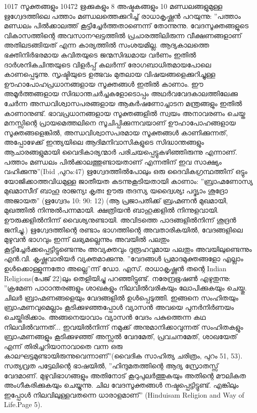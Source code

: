 1017 സൂക്തങ്ങളും 10472 ഋക്കുകളും 8 അഷ്ടകങ്ങളും 10 മണ്ഡലങ്ങളുമുള്ള ഋഗ്വേദത്തിലെ പത്താം മണ്ഡലത്തെക്കുറിച്ച് രാധാകൃഷ്ണന്‍ പറയുന്നു: ''പത്താം മണ്ഡലം പില്‍ക്കാലത്ത് കൂട്ടിച്ചേര്‍ത്തതാണെന്ന് തോന്നുന്നു. വേദസൂക്തങ്ങളുടെ വികാസത്തിന്റെ അവസാനഘട്ടത്തില്‍ പ്രചാരത്തിലിരുന്ന വീക്ഷണങ്ങളാണ് അതിലടങ്ങിയത് എന്ന കാര്യത്തില്‍ സംശയമില്ല. ആദ്യകാലത്തെ ഭക്തിനിര്‍ഭരമായ കവിതയുടെ ജന്മസിദ്ധമായ വര്‍ണം ഇതില്‍ ദാര്‍ശനികചിന്തയുടെ വിളര്‍പ്പ് കലര്‍ന്ന് രോഗബാധിതമായപോലെ കാണപ്പെടുന്നു. സൃഷ്ടിയുടെ ഉത്ഭവം മുതലായ വിഷയങ്ങളെക്കുറിച്ചുള്ള ഊഹാപോഹപ്രധാനങ്ങളായ സൂക്തങ്ങള്‍ ഇതില്‍ കാണാം. ഈ അമൂര്‍ത്തങ്ങളായ സിദ്ധാന്തചര്‍ച്ചകളോടൊപ്പം അഥര്‍വവേദകാലത്തിലേക്കു ചേര്‍ന്ന അന്ധവിശ്വാസപരങ്ങളായ ആകര്‍ഷണോച്ചാടന മന്ത്രങ്ങളും ഇതില്‍ കാണാനുണ്ട്. ഭാവപ്രധാനങ്ങളായ സൂക്തങ്ങളില്‍ സ്വയം അനാവരണം ചെയ്ത മനസ്സിന്റെ പ്രായമെത്തലിനെ സൂചിപ്പിക്കുന്നവയാണ് ഊഹാപോഹങ്ങളായ സൂക്തങ്ങളെങ്കില്‍, അന്ധവിശ്വാസപരമായ സൂക്തങ്ങള്‍ കാണിക്കുന്നത്, അപ്പോഴേക്ക് ഇന്ത്യയിലെ ആദിമനിവാസികളുടെ സിദ്ധാന്തങ്ങളും ആചാരങ്ങളുമായി വൈദികാര്യന്മാര്‍ പരിചയപ്പെട്ടുകഴിഞ്ഞിരുന്നു എന്നാണ്. പത്താം മണ്ഡലം പില്‍ക്കാലത്തുണ്ടായതാണ് എന്നതിന് ഇവ സാക്ഷ്യം വഹിക്കുന്നു''(Ibid ,പുറം:47)
ഋഗ്വേദത്തില്‍പോലും ഒരു ദൈവികഗ്രന്ഥത്തിന് ഒട്ടും യോജിക്കാത്തവിധമുള്ള ജാതീയത കടന്നുകൂടിയതായി കാണാം:
''ബ്രാഹ്മണോസ്യ മുഖമാസീദ്
ബാഹൂ രാജന്യഃ കൃതഃ
ഊരു തദസ്യ യദ്വൈശ്യഃ
പദ്ഭ്യാം ശൂദ്രോ അജായത'' (ഋഗ്വേദം 10: 90: 12)
(ആ പ്രജാപതിക്ക് ബ്രഹ്മണന്‍ മുഖമായി, മുഖത്തില്‍ നിന്നുല്‍പന്നമായി. ക്ഷത്രിയന്‍ ബാഹുക്കളില്‍ നിന്നുളവായി. ഊരുക്കളില്‍നിന്ന് വൈശ്യനുണ്ടായി. അവിടത്തെ പാദങ്ങളില്‍നിന്ന് ശൂദ്രന്‍ ജനിച്ചു.)
ഋഗ്വേദത്തിന്റെ രണ്ടാം ഭാഗത്തിന്റെ അവതാരികയില്‍, വേദങ്ങളിലെ മുഴുവന്‍ ഭാഗവും ഇന്ന് ലഭ്യമല്ലെന്നും അവയില്‍ പലതും കൂട്ടിച്ചേര്‍ക്കപ്പെട്ടിട്ടുണ്ടെന്നും അവ്യക്തവും ദുരൂഹവുമായ പലതും അവയിലുണ്ടെന്നും എന്‍.വി. കൃഷ്ണവാരിയര്‍ വ്യക്തമാക്കുന്നു.
''വേദങ്ങള്‍ പ്രമാദമുക്തങ്ങളോ എല്ലാം ഉള്‍ക്കൊള്ളുന്നതോ അല്ലെ''ന്ന് ഡോ. എസ്. രാധാകൃഷ്ണന്‍ തന്റെ Indian Religions(പേജ് 22)ലും തെളിയിച്ചു പറഞ്ഞിട്ടുണ്ട്. നരേന്ദ്രഭൂഷണ്‍ എഴുതുന്നു: ''ക്രമേണ പാഠാന്തരങ്ങളും ശാഖകളും നിലവില്‍വരികയും ലോപിക്കുകയും ചെയ്തു. ചിലര്‍ ബ്രാഹ്മണങ്ങളെയും വേദങ്ങളില്‍ ഉള്‍പ്പെടുത്തി. ഇങ്ങനെ സംഹിതയും ബ്രാഹ്മണവുമെല്ലാം കൂടിക്കുഴഞ്ഞപ്പോള്‍ വ്യാസന്‍ അവയെ പുനര്‍നിര്‍ണയം ചെയ്തിരിക്കാം. അങ്ങനെയാവാം വ്യാസന്‍ വേദം പകുത്തെന്ന കഥ നിലവില്‍വന്നത്... ഇവയില്‍നിന്ന് നമുക്ക് അനുമാനിക്കാവുന്നത് സംഹിതകളും ബ്രാഹ്മണങ്ങളും കൂടിക്കുഴഞ്ഞ് അസ്സല്‍ വേദമേത്, പ്രവചനമേത്, ശാഖയേത് എന്ന് തിരിച്ചറിയാനാവാതെ വന്ന ഒരു കാലഘട്ടമുണ്ടായിരുന്നുവെന്നാണ്''(വൈദിക സാഹിത്യ ചരിത്രം, പുറം 51, 53).
സത്യവ്രത പട്ടേലിന്റെ ഭാഷയില്‍, ''ഹിന്ദുമതത്തിന്റെ ആദ്യ സ്രോതസ്സ് വേദമാണ്. മുഴുവിഭാഗങ്ങളും അതിനോട് കൂറുപുലര്‍ത്തുകയും അതിന്റെ മൗലികത അംഗീകരിക്കുകയും ചെയ്യുന്നു. ചില വേദസൂക്തങ്ങള്‍ നഷ്ടപ്പെട്ടിട്ടുണ്ട്. എങ്കിലും ഇപ്പോള്‍ നിലവിലുള്ളവതന്നെ ധാരാളമാണ്'' (Hinduisam Religion and Way of Life.Page 5).
